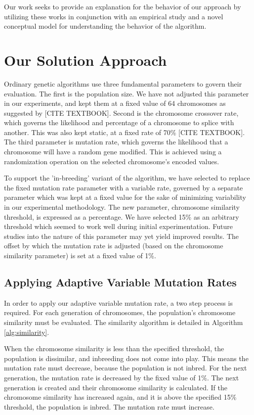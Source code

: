 \documentclass{sig-alternate}
\begin{document}
Our work seeks to provide an explanation for the behavior of our approach by utilizing these works in conjunction with an empirical study and a novel conceptual model for understanding the behavior of the algorithm.

% 
%
\section{Our Solution Approach}\label{params}
Ordinary genetic algorithms use three fundamental parameters to govern their evaluation. The first is the population size. We have not adjusted this parameter in our experiments, and kept them at a fixed value of 64 chromosomes as suggested by [CITE TEXTBOOK]. Second is the chromosome crossover rate, which governs the likelihood and percentage of a chromosome to splice with another. This was also kept static, at a fixed rate of 70\% [CITE TEXTBOOK]. The third parameter is mutation rate, which governs the likelihood that a chromosome will have a random gene modified. This is achieved using a randomization operation on the selected chromosome's encoded values. 

To support the 'in-breeding' variant of the algorithm, we have selected to replace the fixed mutation rate parameter with a variable rate, governed by a separate parameter which was kept at a fixed value for the sake of minimizing variability in our experimental methodology. The new parameter, chromosome similarity threshold, is expressed as a percentage. We have selected 15\% as an arbitrary threshold which seemed to work well during initial experimentation. Future studies into the nature of this parameter may yet yield improved results. The offset by which the mutation rate is adjusted (based on the chromosome similarity parameter) is set at a fixed value of 1\%.

\subsection{Applying Adaptive Variable Mutation Rates}
In order to apply our adaptive variable mutation rate, a two step process is required. For each generation of chromosomes, the population's chromosome similarity must be evaluated. The similarity algorithm is detailed in Algorithm \ref{alg:similarity}.  

When the chromosome similarity is less than the specified threshold, the population is dissimilar, and inbreeding does not come into play. This means the mutation rate must decrease, because the population is not inbred. For the next generation, the mutation rate is decreased by the fixed value of 1\%. The next generation is created and their chromosome similarity is calculated. If the chromosome similarity has increased again, and it is above the specified 15\% threshold, the population is inbred. The mutation rate must increase. 
\end{document}
